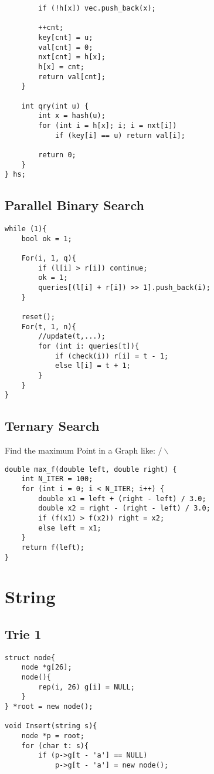 \documentclass[11pt,a4paper]{article}
\begin{document}
\begin{multicols*}{2}
\begin{lstlisting}
        if (!h[x]) vec.push_back(x);
 
        ++cnt;
        key[cnt] = u;
        val[cnt] = 0;
        nxt[cnt] = h[x];
        h[x] = cnt;
        return val[cnt];
    }
    
    int qry(int u) {
        int x = hash(u);
        for (int i = h[x]; i; i = nxt[i])
            if (key[i] == u) return val[i];
 
        return 0;
    }
} hs;
\end{lstlisting}

\subsection{Parallel Binary Search}
\begin{lstlisting}
while (1){
    bool ok = 1;

    For(i, 1, q){
        if (l[i] > r[i]) continue;
        ok = 1;
        queries[(l[i] + r[i]) >> 1].push_back(i);
    }

    reset();
    For(t, 1, n){
        //update(t,...);
        for (int i: queries[t]){
            if (check(i)) r[i] = t - 1;
            else l[i] = t + 1;
        }
    }
}
\end{lstlisting}

\subsection{Ternary Search}
Find the maximum Point in a Graph like: $\slash\backslash$
\begin{lstlisting}
double max_f(double left, double right) {
    int N_ITER = 100;
    for (int i = 0; i < N_ITER; i++) {
        double x1 = left + (right - left) / 3.0;
        double x2 = right - (right - left) / 3.0;
        if (f(x1) > f(x2)) right = x2;
        else left = x1;
    }
    return f(left);
}    
\end{lstlisting}

\section {String}
\subsection{Trie 1}
\begin{lstlisting}
struct node{
	node *g[26];
	node(){
		rep(i, 26) g[i] = NULL;
	}
} *root = new node();

void Insert(string s){
	node *p = root;
	for (char t: s){
		if (p->g[t - 'a'] == NULL)
			p->g[t - 'a'] = new node();
		

\end{lstlisting}
\end{multicols*}
\end{document}
